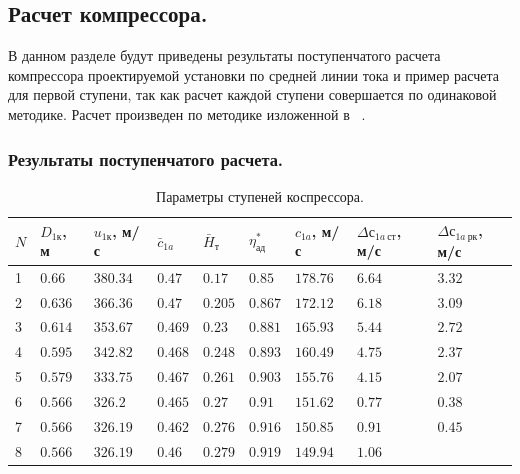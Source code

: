 \documentclass[a4paper,12pt]{article}
\begin{document}
    \subsection{Расчет компрессора.}
    В данном разделе будут приведены результаты поступенчатого расчета компрессора проектируемой установки
    по средней линии тока и пример расчета для первой ступени, так как расчет каждой ступени совершается
    по одинаковой методике.
    Расчет произведен по методике изложенной в ~\cite{beknev_comp}.
    \subsubsection{Результаты поступенчатого расчета.}
%    
    
    \begin{longtable}{|p{0.6cm}|p{1.2cm}|p{1.2cm}|p{1.2cm}|p{1.2cm}|p{1.2cm}|p{1.2cm}|p{1.2cm}|p{1.3cm}|}
        \caption{Параметры ступеней коспрессора.}\\ \hline
        $N$ & $D_{1к}$, м & $u_{1к}$, м/с & $\bar{c}_{1a}$ & $\bar{H}_т$ & $\eta_{ад}^*$ &
        $c_{1a}$, м/с & $\Delta с_{1a\ ст}$, м/с & $\Delta с_{1a\ рк}$, м/с \\ \hline
%        
        1 & $0.66$ & $380.34$ &
        $0.47$ &
        $0.17$ & $0.85$ &
        $178.76$ & $6.64$ &
        $3.32$ \\ \hline
%        
        2 & $0.636$ & $366.36$ &
        $0.47$ &
        $0.205$ & $0.867$ &
        $172.12$ & $6.18$ &
        $3.09$ \\ \hline
%        
        3 & $0.614$ & $353.67$ &
        $0.469$ &
        $0.23$ & $0.881$ &
        $165.93$ & $5.44$ &
        $2.72$ \\ \hline
%        
        4 & $0.595$ & $342.82$ &
        $0.468$ &
        $0.248$ & $0.893$ &
        $160.49$ & $4.75$ &
        $2.37$ \\ \hline
%        
        5 & $0.579$ & $333.75$ &
        $0.467$ &
        $0.261$ & $0.903$ &
        $155.76$ & $4.15$ &
        $2.07$ \\ \hline
%        
        6 & $0.566$ & $326.2$ &
        $0.465$ &
        $0.27$ & $0.91$ &
        $151.62$ & $0.77$ &
        $0.38$ \\ \hline
%        
        7 & $0.566$ & $326.19$ &
        $0.462$ &
        $0.276$ & $0.916$ &
        $150.85$ & $0.91$ &
        $0.45$ \\ \hline
%        
        8 & $0.566$ & $326.19$ &
        $0.46$ &
        $0.279$ & $0.919$ &
        $149.94$ & $1.06$ &

\end{longtable}
\end{document}
